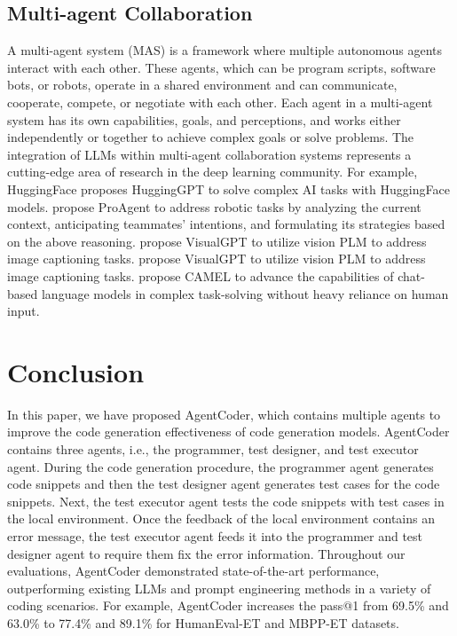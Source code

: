 \documentclass[manuscript,screen,review]{acmart}
\newcommand{\jie}[1]{{\color{blue}(Jie says: #1)}}
\newcommand{\xxx}{AgentCoder\xspace}
\begin{document}
\subsection{Multi-agent Collaboration}
A multi-agent system (MAS) is a framework where multiple autonomous agents interact with each other. These agents, which can be program scripts, software bots, or robots, operate in a shared environment and can communicate, cooperate, compete, or negotiate with each other. Each agent in a multi-agent system has its own capabilities, goals, and perceptions, and works either independently or together to achieve complex goals or solve problems. The integration of LLMs within multi-agent collaboration systems represents a cutting-edge area of research in the deep learning community. For example, HuggingFace proposes HuggingGPT to solve complex AI tasks with HuggingFace models. \citeauthor{Zhang2023ProAgentBP} propose ProAgent to address robotic tasks by analyzing the current context, anticipating teammates' intentions, and formulating its strategies based on the above reasoning. \citeauthor{Chen2021VisualGPTDA} propose VisualGPT to utilize vision PLM to address image captioning tasks. \citet{Chen2021VisualGPTDA} propose VisualGPT to utilize vision PLM to address image captioning tasks. \citet{li2023camel} propose CAMEL to advance the capabilities of chat-based language models in complex task-solving without heavy reliance on human input.

\section{Conclusion}
In this paper, we have proposed \xxx, which contains multiple agents to improve the code generation effectiveness of code generation models. \xxx contains three agents, i.e., the programmer, test designer, and test executor agent. During the code generation procedure, the programmer agent generates code snippets and then the test designer agent generates test cases for the code snippets. Next, the test executor agent tests the code snippets with test cases in the local environment. Once the feedback of the local environment contains an error message, the test executor agent feeds it into the programmer and test designer agent to require them fix the error information. Throughout our evaluations, \xxx demonstrated state-of-the-art performance, outperforming existing LLMs and prompt engineering methods in a variety of coding scenarios. For example, \xxx increases the pass@1 from 69.5\% and 63.0\% to 77.4\% and 89.1\% for HumanEval-ET and MBPP-ET datasets.







\end{document}
